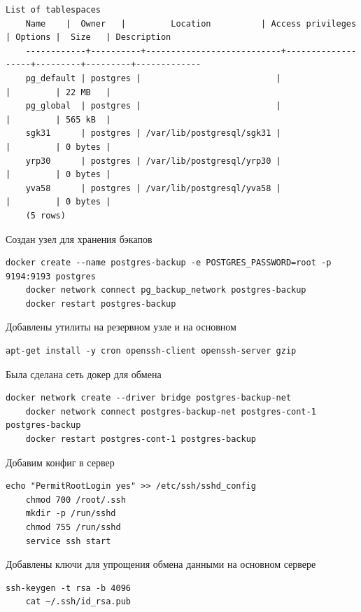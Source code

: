\documentclass{article}
\begin{document}
\begin{lstlisting}[caption={kitty}, label={lst:example}]
    List of tablespaces
    Name    |  Owner   |         Location          | Access privileges | Options |  Size   | Description 
    ------------+----------+---------------------------+-------------------+---------+---------+-------------
    pg_default | postgres |                           |                   |         | 22 MB   | 
    pg_global  | postgres |                           |                   |         | 565 kB  | 
    sgk31      | postgres | /var/lib/postgresql/sgk31 |                   |         | 0 bytes | 
    yrp30      | postgres | /var/lib/postgresql/yrp30 |                   |         | 0 bytes | 
    yva58      | postgres | /var/lib/postgresql/yva58 |                   |         | 0 bytes | 
    (5 rows)
\end{lstlisting}


Создан узел для хранения бэкапов

\begin{lstlisting}[caption={kitty}, label={lst:example}]
    docker create --name postgres-backup -e POSTGRES_PASSWORD=root -p 9194:9193 postgres
    docker network connect pg_backup_network postgres-backup
    docker restart postgres-backup
\end{lstlisting}

Добавлены утилиты на резервном узле и на основном
\begin{lstlisting}[caption={kitty}, label={lst:example}]
    apt-get install -y cron openssh-client openssh-server gzip
\end{lstlisting}

Была сделана сеть докер для обмена

\begin{lstlisting}[caption={kitty}, label={lst:example}]
    docker network create --driver bridge postgres-backup-net 
    docker network connect postgres-backup-net postgres-cont-1 postgres-backup
    docker restart postgres-cont-1 postgres-backup
\end{lstlisting}

Добавим конфиг в сервер 
\begin{lstlisting}[caption={kitty}, label={lst:example}]
    echo "PermitRootLogin yes" >> /etc/ssh/sshd_config
    chmod 700 /root/.ssh
    mkdir -p /run/sshd
    chmod 755 /run/sshd
    service ssh start
\end{lstlisting}

Добавлены ключи для упрощения обмена данными на основном сервере
\begin{lstlisting}[caption={kitty}, label={lst:example}]
    ssh-keygen -t rsa -b 4096
    cat ~/.ssh/id_rsa.pub 
\end{lstlisting}
\end{document}
